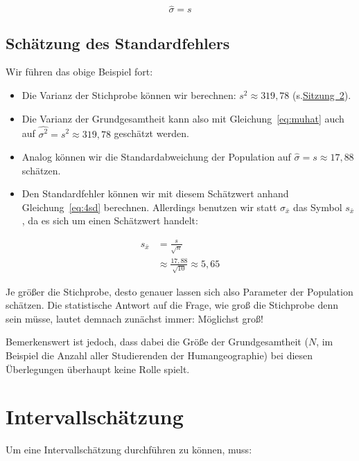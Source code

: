 \documentclass[
  11pt,
  ngerman,
  a4paper,
]{report}
\providecommand{\tightlist}{%
  \setlength{\itemsep}{0pt}\setlength{\parskip}{0pt}}
\begin{document}
\[
\hat{\sigma} = s \label{eq:sigmahat}
\]

\hypertarget{schuxe4tzung-des-standardfehlers}{%
\subsection{Schätzung des Standardfehlers}\label{schuxe4tzung-des-standardfehlers}}

Wir führen das obige Beispiel fort:

\begin{itemize}
\tightlist
\item
  Die Varianz der Stichprobe können wir berechnen: \(s^2\approx319{,}78\) (s.\protect\hyperlink{varianz}{Sitzung~2}).
\item
  Die Varianz der Grundgesamtheit kann also mit Gleichung~\eqref{eq:muhat} auch auf \(\hat{\sigma^2}=s^2\approx319{,}78\) geschätzt werden.
\item
  Analog können wir die Standardabweichung der Population auf \(\hat{\sigma}=s\approx17{,}88\) schätzen.
\item
  Den Standardfehler können wir mit diesem Schätzwert anhand Gleichung~\eqref{eq:4sd} berechnen. Allerdings benutzen wir statt \(\sigma_{\bar{x}}\) das Symbol \(s_{\bar{x}}\), da es sich um einen Schätzwert handelt:
\end{itemize}

\nopagebreak

\[
\begin{aligned}
s_{\bar{x}} &= \frac{s}{\sqrt{n}}\\[4pt]
&\approx \frac{17{,}88}{\sqrt{10}}\approx5{,}65
\end{aligned}
\]

Je größer die Stichprobe, desto genauer lassen sich also Parameter der Population schätzen. Die statistische Antwort auf die Frage, wie groß die Stichprobe denn sein müsse, lautet demnach zunächst immer: Möglichst groß!

Bemerkenswert ist jedoch, dass dabei die Größe der Grundgesamtheit (\(N\), im Beispiel die Anzahl aller Studierenden der Humangeographie) bei diesen Überlegungen überhaupt keine Rolle spielt.

\hypertarget{intervallschuxe4tzung}{%
\section{Intervallschätzung}\label{intervallschuxe4tzung}}

Um eine Intervallschätzung durchführen zu können, muss:
\end{document}
